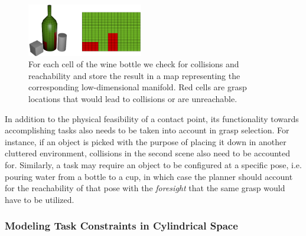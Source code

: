 \documentclass{aamas2015}
\begin{document}
\begin{figure}[t]
  \begin{center}
    \includegraphics[width=0.45\textwidth]{./images/bottlemapping.png} \quad
  \end{center}
  \caption{For each cell of the wine bottle we check for collisions and reachability and store the result in a map representing the corresponding low-dimensional manifold. Red cells are grasp locations that would lead to collisions or are unreachable.}
  \label{fig:bottlemapping} 
\end{figure}
In addition to the physical feasibility of a contact point, its functionality towards accomplishing tasks also needs to be taken into account in grasp selection. For instance, if an object is picked with the purpose of
placing it down in another cluttered environment, collisions in the second scene also need to be accounted for. Similarly, a task may require an object to be configured at a specific pose, i.e. pouring water from a bottle to a cup, in which case the planner should account for the reachability of
that pose with the \textit{foresight} that the same grasp would have to be utilized. 

\subsubsection{Modeling Task Constraints in Cylindrical Space}
\end{document}
